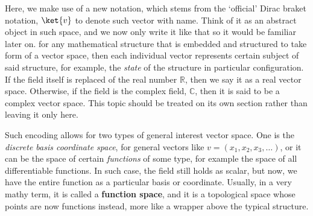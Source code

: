 Here, we make use of a new notation, which stems from the `official' Dirac braket notation, $\ket{v}$ to denote such vector with name. Think of it as an abstract object in such space, and we now only write it like that so it would be familiar later on. for any mathematical structure that is embedded and structured to take form of a vector space, then each individual vector represents certain subject of said structure, for example, the \textit{state} of the structure in particular configuration. If the field itself is replaced of the real number $\mathbb{R}$, then we say it as a real vector space. Otherwise, if the field is the complex field, $\mathbb{C}$, then it is said to be a complex vector space. This topic should be treated on its own section rather than leaving it only here. 

Such encoding allows for two types of general interest vector space. One is the \textit{discrete basis coordinate space}, for general vectors like $v=(x_1,x_2,x_3,\dots)$, or it can be the space of certain \textit{functions} of some type, for example the space of all differentiable functions. In such case, the field still holds as scalar, but now, we have the entire function as a particular basis or coordinate. Usually, in a very mathy term, it is called a \textbf{function space}, and it is a topological space whose points are now functions instead, more like a wrapper above the typical structure. 

